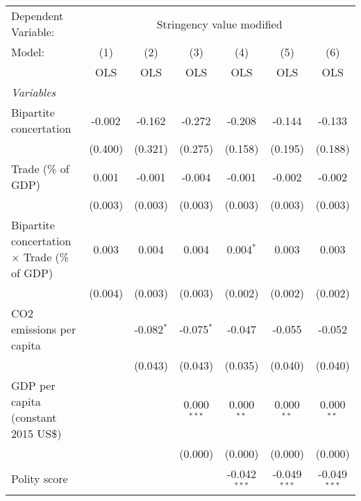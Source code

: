 
\begingroup
\centering
\begin{tabular}{lcccccc}
   \toprule
   Dependent Variable: & \multicolumn{6}{c}{Stringency value modified}\\
   Model:                                              & (1)     & (2)          & (3)           & (4)            & (5)            & (6)\\  
                                                       &  OLS    & OLS          & OLS           & OLS            & OLS            & OLS\\  
   \midrule
   \emph{Variables}\\
   Bipartite concertation                              & -0.002  & -0.162       & -0.272        & -0.208         & -0.144         & -0.133\\   
                                                       & (0.400) & (0.321)      & (0.275)       & (0.158)        & (0.195)        & (0.188)\\   
   Trade (\% of GDP)                                   & 0.001   & -0.001       & -0.004        & -0.001         & -0.002         & -0.002\\   
                                                       & (0.003) & (0.003)      & (0.003)       & (0.003)        & (0.003)        & (0.003)\\   
   Bipartite concertation $\times$ Trade (\% of GDP)   & 0.003   & 0.004        & 0.004         & 0.004$^{*}$    & 0.003          & 0.003\\   
                                                       & (0.004) & (0.003)      & (0.003)       & (0.002)        & (0.002)        & (0.002)\\   
   CO2 emissions per capita                            &         & -0.082$^{*}$ & -0.075$^{*}$  & -0.047         & -0.055         & -0.052\\   
                                                       &         & (0.043)      & (0.043)       & (0.035)        & (0.040)        & (0.040)\\   
   GDP per capita (constant 2015 US\$)                 &         &              & 0.000$^{***}$ & 0.000$^{**}$   & 0.000$^{**}$   & 0.000$^{**}$\\   
                                                       &         &              & (0.000)       & (0.000)        & (0.000)        & (0.000)\\   
   Polity score                                        &         &              &               & -0.042$^{***}$ & -0.049$^{***}$ & -0.049$^{***}$\\   

\end{tabular}
